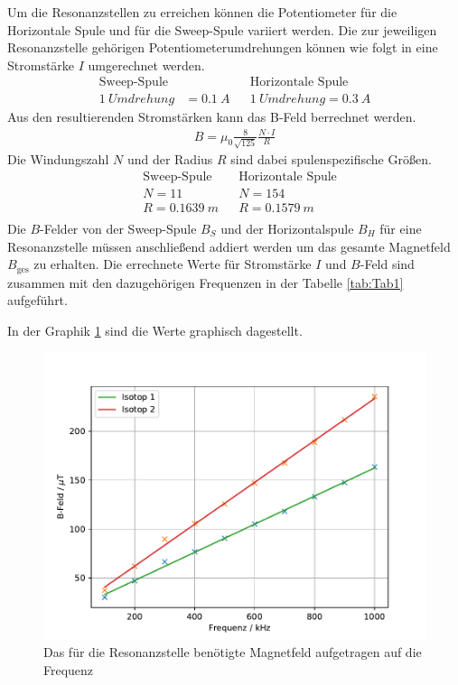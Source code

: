 Um die Resonanzstellen zu erreichen können die Potentiometer für die Horizontale Spule und für die Sweep-Spule variiert werden.
Die zur jeweiligen Resonanzstelle gehörigen Potentiometerumdrehungen können wie folgt in eine Stromstärke $I$ umgerechnet werden.
\begin{align*}
  \text{Sweep-Spule}&&&\text{Horizontale Spule}\\
  \SI{1}{Umdrehung} &= \SI{0,1}{A}&&\SI{1}{Umdrehung} = \SI{0,3}{A}
\end{align*}
Aus den resultierenden Stromstärken kann das B-Feld berrechnet werden.
\begin{align*}
  B=\mu_0\frac{8}{\sqrt{125}}\frac{N\cdot I}{R}
\end{align*}
Die Windungszahl $N$ und der Radius $R$ sind dabei spulenspezifische Größen.
\begin{align*}
  &\text{Sweep-Spule}&&\text{Horizontale Spule}\\
  &N=11&&N=154\\
  &R=\SI{0.1639}{m}&&R=\SI{0.1579}{m}\\
\end{align*}
Die $B$-Felder von der Sweep-Spule $B_S$ und der Horizontalspule $B_H$ für eine Resonanzstelle müssen anschließend addiert werden um das gesamte Magnetfeld $B_{\text{ges}}$ zu erhalten.
Die errechnete Werte für Stromstärke $I$ und $B$-Feld sind zusammen mit den dazugehörigen Frequenzen in der Tabelle \ref{tab:Tab1} aufgeführt.

In der Graphik \ref{fig:Bf} sind die Werte graphisch dagestellt.
\begin{figure}[h!]
  \centering
  \includegraphics[width=\textwidth]{B-Feld.pdf}
  \caption{Das für die Resonanzstelle benötigte Magnetfeld aufgetragen auf die Frequenz}
  \label{fig:Bf}
\end{figure}
